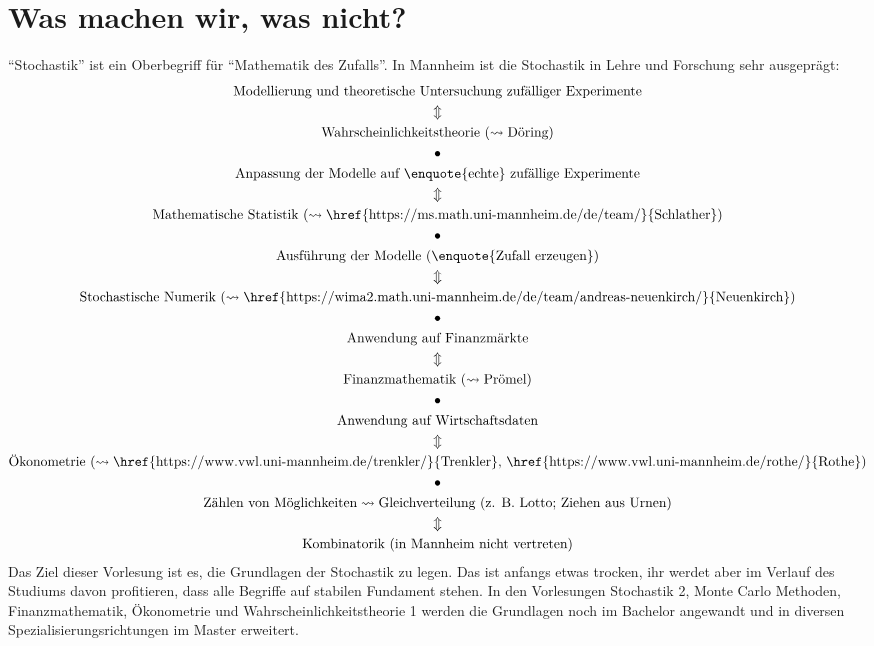 \chapter*{Was machen wir, was nicht?}
	
	
	\enquote{Stochastik} ist ein Oberbegriff für \enquote{Mathematik des Zufalls}. In Mannheim ist die Stochastik in Lehre und Forschung sehr ausgeprägt:
	\begin{gather*}
	\text{Modellierung und theoretische Untersuchung zufälliger Experimente}\\
	\Updownarrow \\
	\text{Wahrscheinlichkeitstheorie }(\rightsquigarrow \text{Döring)}\\
	\bullet\\
	\text{Anpassung der Modelle auf \enquote{echte} zufällige Experimente}\\
	\Updownarrow \\
	\text{Mathematische Statistik }(\rightsquigarrow \text{\href{https://ms.math.uni-mannheim.de/de/team/}{Schlather})}\\
	\bullet\\
	\text{Ausführung der Modelle (\enquote{Zufall erzeugen})}\\
	\Updownarrow \\
	\text{Stochastische Numerik }(\rightsquigarrow \text{\href{https://wima2.math.uni-mannheim.de/de/team/andreas-neuenkirch/}{Neuenkirch})}\\
	\bullet\\
	\text{Anwendung auf Finanzmärkte}\\
	\Updownarrow \\
	\text{Finanzmathematik }(\rightsquigarrow \text{Prömel)}\\
	\bullet\\
	\text{Anwendung auf Wirtschaftsdaten}\\
	\Updownarrow \\
	\text{Ökonometrie }(\rightsquigarrow \text{\href{https://www.vwl.uni-mannheim.de/trenkler/}{Trenkler}, \href{https://www.vwl.uni-mannheim.de/rothe/}{Rothe})}\\
	\bullet\\
	\text{Zählen von Möglichkeiten}\rightsquigarrow \text{Gleichverteilung (z. B. Lotto; Ziehen aus Urnen)}\\
	\Updownarrow \\
	\text{Kombinatorik (in Mannheim nicht vertreten)}\\
	\end{gather*}
	Das Ziel dieser Vorlesung ist es, die Grundlagen der Stochastik zu legen. Das ist anfangs etwas trocken, ihr werdet aber im Verlauf des Studiums davon profitieren, dass alle Begriffe auf stabilen Fundament stehen. In den Vorlesungen Stochastik 2, Monte Carlo Methoden, Finanzmathematik, \"Okonometrie und Wahrscheinlichkeitstheorie 1 werden die Grundlagen noch im Bachelor angewandt und in diversen Spezialisierungsrichtungen im Master erweitert.